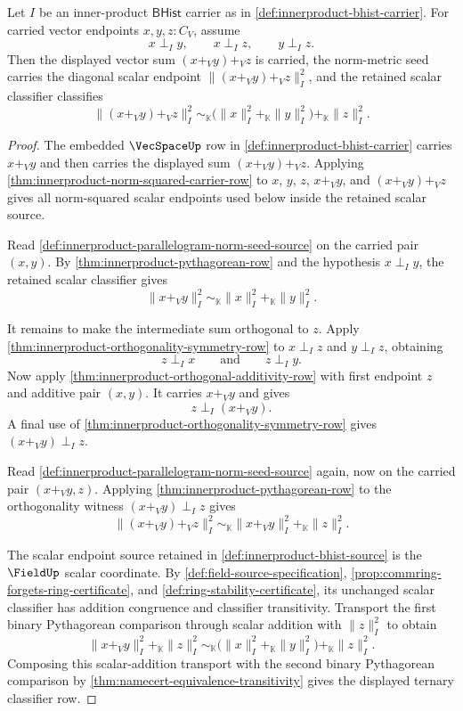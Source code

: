 \begin{theorem}
\label{thm:innerproduct-ternary-orthogonal-pythagorean-row}
Let $I$ be an inner-product $\mathsf{BHist}$ carrier as in
\autoref{def:innerproduct-bhist-carrier}. For carried vector endpoints
$x,y,z:C_V$, assume
$$
x\perp_I y,
\qquad
x\perp_I z,
\qquad
y\perp_I z.
$$
Then the displayed vector sum $(x+_V y)+_V z$ is carried, the norm-metric
seed carries the diagonal scalar endpoint $\|(x+_V y)+_V z\|_{I}^{2}$, and the
retained scalar classifier classifies
$$
\|(x+_V y)+_V z\|_{I}^{2}
\sim_{\mathbb{K}}
\bigl(\|x\|_{I}^{2}+_{\mathbb{K}}\|y\|_{I}^{2}\bigr)
+_{\mathbb{K}}
\|z\|_{I}^{2}.
$$
\end{theorem}
\begin{proof}
The embedded $\VecSpaceUp$ row in
\autoref{def:innerproduct-bhist-carrier} carries $x+_V y$ and then carries the
displayed sum $(x+_V y)+_V z$. Applying
\autoref{thm:innerproduct-norm-squared-carrier-row} to $x$, $y$, $z$,
$x+_V y$, and $(x+_V y)+_V z$ gives all norm-squared scalar endpoints used
below inside the retained scalar source.

Read \autoref{def:innerproduct-parallelogram-norm-seed-source} on the carried
pair $(x,y)$. By \autoref{thm:innerproduct-pythagorean-row} and the hypothesis
$x\perp_I y$, the retained scalar classifier gives
$$
\|x+_V y\|_{I}^{2}
\sim_{\mathbb{K}}
\|x\|_{I}^{2}+_{\mathbb{K}}\|y\|_{I}^{2}.
$$

It remains to make the intermediate sum orthogonal to $z$. Apply
\autoref{thm:innerproduct-orthogonality-symmetry-row} to $x\perp_I z$ and
$y\perp_I z$, obtaining
$$
z\perp_I x
\qquad\text{and}\qquad
z\perp_I y.
$$
Now apply \autoref{thm:innerproduct-orthogonal-additivity-row} with first
endpoint $z$ and additive pair $(x,y)$. It carries $x+_V y$ and gives
$$
z\perp_I (x+_V y).
$$
A final use of \autoref{thm:innerproduct-orthogonality-symmetry-row} gives
$(x+_V y)\perp_I z$.

Read \autoref{def:innerproduct-parallelogram-norm-seed-source} again, now on
the carried pair $(x+_V y,z)$. Applying
\autoref{thm:innerproduct-pythagorean-row} to the orthogonality witness
$(x+_V y)\perp_I z$ gives
$$
\|(x+_V y)+_V z\|_{I}^{2}
\sim_{\mathbb{K}}
\|x+_V y\|_{I}^{2}+_{\mathbb{K}}\|z\|_{I}^{2}.
$$

The scalar endpoint source retained in \autoref{def:innerproduct-bhist-source}
is the $\FieldUp$ scalar coordinate. By
\autoref{def:field-source-specification},
\autoref{prop:commring-forgets-ring-certificate}, and
\autoref{def:ring-stability-certificate}, its unchanged scalar classifier has
addition congruence and classifier transitivity. Transport the first binary
Pythagorean comparison through scalar addition with $\|z\|_{I}^{2}$ to obtain
$$
\|x+_V y\|_{I}^{2}+_{\mathbb{K}}\|z\|_{I}^{2}
\sim_{\mathbb{K}}
\bigl(\|x\|_{I}^{2}+_{\mathbb{K}}\|y\|_{I}^{2}\bigr)
+_{\mathbb{K}}
\|z\|_{I}^{2}.
$$
Composing this scalar-addition transport with the second binary Pythagorean
comparison by \autoref{thm:namecert-equivalence-transitivity} gives the
displayed ternary classifier row.
\end{proof}

